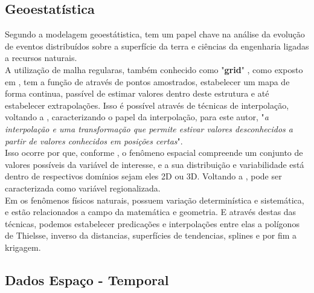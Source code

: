   \subsection{Geoestatística} 

 \hspace*{1.25 cm} Segundo \cite[p.1]{delgado}  a modelagem geoestátistica, tem um papel chave na análise da evolução de eventos distribuídos sobre a superfície da terra e ciências da engenharia ligadas a recursos naturais. \\
   \hspace*{1.25 cm} A  utilização de malha regularas, também conhecido como "\textbf{grid}" , como exposto em \cite[p.83]{Andriotti}, tem a função de através de pontos amostrados, estabelecer um mapa de forma continua, passível de estimar valores dentro deste estrutura e até estabelecer extrapolações. Isso é possível através de técnicas de interpolação, voltando a \cite[p.304]{Ariza},  caracterizando o papel da interpolação, para este autor, "\textit{a interpolação e uma transformação que permite estivar valores desconhecidos a partir de valores conhecidos em posições certas}". \\
    \hspace*{1.25 cm} Isso ocorre por que, conforme \cite[p.21]{Yamamoto}, o fenômeno espacial compreende um conjunto de valores possíveis da variável de interesse, e a sua distribuição e variabilidade está dentro de respectivos domínios sejam eles 2D ou 3D.  Voltando a  \cite[p.95]{Andriotti}, pode ser caracterizada como variável regionalizada.\\
  \hspace*{1.25 cm}  Em  \cite[p.37]{Webster} os fenômenos físicos naturais, possuem variação determinística e sistemática, e estão relacionados a campo da matemática e geometria. E através destas das técnicas, podemos estabelecer predicações e interpolações entre elas a polígonos de Thielsse, inverso da distancias, superfícies de tendencias, splines e por fim a krigagem.   
  \subsection{Dados Espaço - Temporal} 
  
